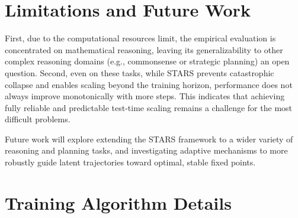 
\section{Limitations and Future Work}
First, due to the computational resources limit, the empirical evaluation is concentrated on mathematical reasoning, leaving its generalizability to other complex reasoning domains (e.g., commonsense or strategic planning) an open question. Second, even on these tasks, while STARS prevents catastrophic collapse and enables scaling beyond the training horizon, performance does not always improve monotonically with more steps. This indicates that achieving fully reliable and predictable test-time scaling remains a challenge for the most difficult problems.

Future work will explore extending the STARS framework to a wider variety of reasoning and planning tasks, and investigating adaptive mechanisms to more robustly guide latent trajectories toward optimal, stable fixed points.
\section{Training Algorithm Details}
   
   
